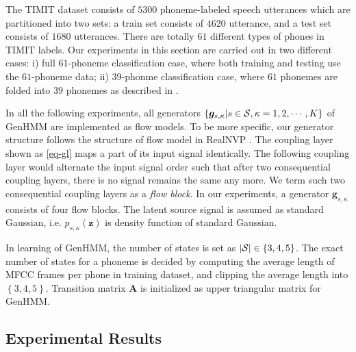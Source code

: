 \documentclass[letterpaper]{article} %
\begin{document}
The TIMIT dataset consists of $5300$ phoneme-labeled speech utterances which are partitioned into two sets: {a train set consists of $4620$ utterance, and a test set consists of $1680$ utterances.} There are totally $61$ different types of phones in TIMIT labels. Our experiments in this section are carried out in two different cases: i) full $61$-phoneme classification case, where both training and testing use the $61$-phoneme data; ii) $39$-phonme classification case, where $61$ phonemes are folded into $39$ phonemes as described in \cite{Perdigao11}.

In all the following experiments, all generators $\left\{\bm{g}_{s,\kappa}|s\in \mathcal{S}, \kappa=1, 2, \cdots, K \right\}$ of GenHMM are implemented as flow models. To be more specific, our generator structure follows the structure of flow model in RealNVP \cite{2016arXiv160508803D}. The coupling layer shown as \eqref{eq-gl} maps a part of its input signal identically. The following coupling layer would alternate the input signal order such that after two consequential coupling layers, there is no signal remains the same any more. We term such two consequential coupling layers as a \textit{flow block}. In our experiments, a generator $\bm{g}_{s,\kappa}$ consists of four flow blocks. The latent source signal is assumed as standard Gaussian, i.e. $p_{s,\kappa}(\bm{z})$ is density function of standard Gaussian.

In learning of GenHMM, the number of states is set as $|\mathcal{S}| \in \left\{ 3,4,5 \right\}$. The exact number of states for a phoneme is decided by computing the average length of MFCC frames per phone in training dataset, and clipping the average length into $\left\{ 3,4,5 \right\}$. Transition matrix $\bm{A}$ is initialized as upper triangular matrix for GenHMM.

\subsection{Experimental Results}
\end{document}
